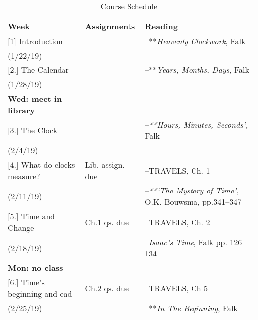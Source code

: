\documentclass[article,oneside]{memoir}
\begin{document}
\begin{center}
\begin{longtable}{p{4.5cm}p{2.5cm}p{5cm}}
 
  \caption{Course Schedule} \\
  \toprule
  \textbf{Week} &\textbf{Assignments} & \textbf{Reading} \\
  \midrule


[1] Introduction		  		& 	& --**\emph{Heavenly Clockwork}, Falk	\\
(1/22/19)					&	&    \\ [1.8\baselineskip]

[2.] The Calendar			& 				& --**\emph{Years, Months, Days}, Falk \\
(1/28/19)			        		& 				&   \\
\textbf{Wed: meet in library} &  & \\  [1.8\baselineskip]


[3.] The Clock   	&   	  	&  		--\emph{**Hours, Minutes, Seconds',} Falk  \\
(2/4/19)		 &						&    \\  [1.8\baselineskip]



[4.] What do clocks measure?	& Lib. assign. due		& --TRAVELS, Ch. 1\\
(2/11/19)				        	& 	& --\emph{**`The Mystery of Time',} O.K. Bouwsma, pp.341--347 \\ [1.8\baselineskip]

[5.] Time and Change	 	& Ch.1 qs. due	& --TRAVELS, Ch. 2\\
(2/18/19)				  	 &  	& --\emph{Isaac's Time}, Falk pp. 126--134 \\ 
\textbf{Mon: no class}		& 	&	\\[1.8\baselineskip]


[6.] Time's beginning and end	 &  Ch.2 qs. due 	&--TRAVELS, Ch 5  \\
(2/25/19)			        	&	&  --**\emph{In The Beginning}, Falk\\ [1.8\baselineskip]



\end{longtable}
\end{center}
\end{document}
